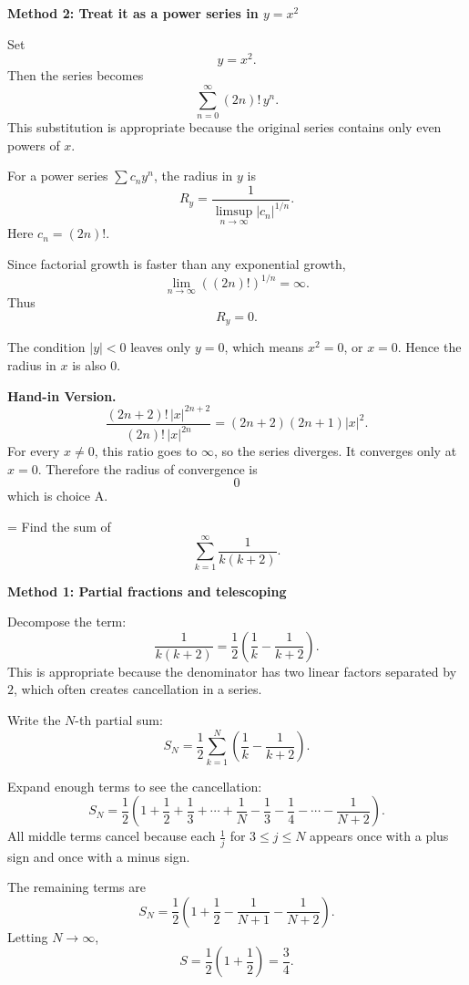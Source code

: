 \documentclass[a4paper,12pt,twocolumn]{article}
\newlength{\problemnumberwidth}
\newenvironment{solutionbox}{\begin{framed}}{\end{framed}}
\newcommand{\problem}[3]{%
  \Needspace{10\baselineskip}%
  \phantomsection\label{#1}%
  \par\vspace{0.8em}%
  \noindent
  \hangindent=\problemnumberwidth
  \hangafter=1
  \makebox[\problemnumberwidth][l]{\textbf{#2.}}#3\par
}
\begin{document}
\begin{solutionbox}
\textbf{Method 2: Treat it as a power series in \(y=x^2\)}

\begin{steps}
\item Set
\[
y=x^2.
\]
Then the series becomes
\[
\sum_{n=0}^{\infty}(2n)!\,y^n.
\]
This substitution is appropriate because the original series contains only even powers of \(x\).

\item For a power series \(\sum c_n y^n\), the radius in \(y\) is
\[
R_y=\frac{1}{\limsup\limits_{n\to\infty}|c_n|^{1/n}}.
\]
Here \(c_n=(2n)!\).

\item Since factorial growth is faster than any exponential growth,
\[
\lim_{n\to\infty}((2n)!)^{1/n}=\infty.
\]
Thus
\[
R_y=0.
\]

\item The condition \(|y|<0\) leaves only \(y=0\), which means \(x^2=0\), or \(x=0\). Hence the radius in \(x\) is also \(0\).
\end{steps}

\textbf{Hand-in Version.}
\[
\frac{(2n+2)!\,|x|^{2n+2}}{(2n)!\,|x|^{2n}}
=(2n+2)(2n+1)|x|^2.
\]
For every \(x\ne0\), this ratio goes to \(\infty\), so the series diverges. It converges only at \(x=0\). Therefore the radius of convergence is
\[
\boxed{0}
\]
which is choice \(\boxed{\text{A}}\).
\end{solutionbox}

\problem{prob:x}{x}{Find the sum of
\[
\sum_{k=1}^{\infty}\frac{1}{k(k+2)}.
\]}

\begin{solutionbox}
\textbf{Method 1: Partial fractions and telescoping}

\begin{steps}
\item Decompose the term:
\[
\frac{1}{k(k+2)}
=\frac12\left(\frac1k-\frac{1}{k+2}\right).
\]
This is appropriate because the denominator has two linear factors separated by \(2\), which often creates cancellation in a series.

\item Write the \(N\)-th partial sum:
\[
S_N=\frac12\sum_{k=1}^{N}\left(\frac1k-\frac{1}{k+2}\right).
\]

\item Expand enough terms to see the cancellation:
\[
S_N=\frac12\left(1+\frac12+\frac13+\cdots+\frac1N
-\frac13-\frac14-\cdots-\frac1{N+2}\right).
\]
All middle terms cancel because each \(\frac1j\) for \(3\le j\le N\) appears once with a plus sign and once with a minus sign.

\item The remaining terms are
\[
S_N=\frac12\left(1+\frac12-\frac1{N+1}-\frac1{N+2}\right).
\]
Letting \(N\to\infty\),
\[
S=\frac12\left(1+\frac12\right)=\frac34.
\]
\end{steps}
\end{solutionbox}
\end{document}
